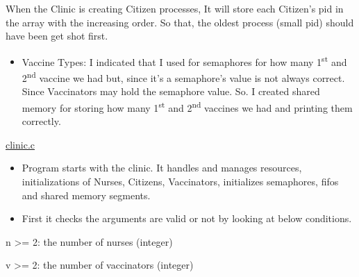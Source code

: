 \documentclass[12pt]{report}
\renewcommand{\_}{\kern-1.5pt\textunderscore\kern-1.5pt}
\begin{document}
\begin{adjustwidth}{0.49in}{0.0in}
\begin{justify}
When the Clinic is creating Citizen processes, It will store each Citizen’s pid in the array with the increasing order. So that, the oldest process (small pid) should have been get shot first.
\end{justify}
\end{adjustwidth}


\vspace{\baselineskip}
\begin{itemize}
	\item Vaccine Types: I indicated that I used for semaphores for how many 1\textsuperscript{st} and 2\textsuperscript{nd} vaccine we had but, since it’s a semaphore’s value is not always correct. Since Vaccinators may hold the semaphore value. So. I created shared memory for storing how many 1\textsuperscript{st} and 2\textsuperscript{nd} vaccines we had and printing them correctly.
\end{itemize}

\vspace{\baselineskip}

\vspace{\baselineskip}
\setlength{\parskip}{8.04pt}
\newpage
\begin{justify}
{\fontsize{16pt}{19.2pt}\selectfont \uline{clinic.c}}
\end{justify}
\begin{itemize}
	\item Program starts with the clinic. It handles and manages resources, initializations of Nurses, Citizens, Vaccinators, initializes semaphores, fifos and shared memory segments.

\vspace{\baselineskip}
	\item First it checks the arguments are valid or not by looking at below conditions.
\end{itemize}
\begin{adjustwidth}{0.5in}{0.0in}
\begin{justify}
n >= 2: the number of nurses (integer)
\end{justify}
\end{adjustwidth}

\begin{adjustwidth}{0.5in}{0.0in}
\begin{justify}
v >= 2: the number of vaccinators (integer)
\end{justify}
\end{adjustwidth}
\end{document}
